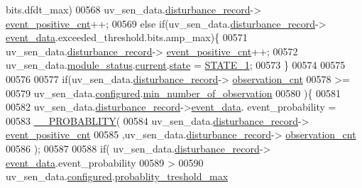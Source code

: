 \begin{DoxyCode}
      bits.dfdt\_max)
00568                uv\_sen\_data.\hyperlink{a00035_ac9b38e2c1d3f1013a88d33506c754152}{disturbance\_record}->
      \hyperlink{a00028_a7397b9d76d4b57500f27bb23d258a18a}{event\_positive\_cnt}++;
00569             \textcolor{keywordflow}{else}  \textcolor{keywordflow}{if}(uv\_sen\_data.\hyperlink{a00035_ac9b38e2c1d3f1013a88d33506c754152}{disturbance\_record}->
      \hyperlink{a00028_a8c0bda69e71ef674e60da47ad0be9ab0}{event\_data}.exceeded\_threshold.bits.amp\_max)\{
00571                uv\_sen\_data.\hyperlink{a00035_ac9b38e2c1d3f1013a88d33506c754152}{disturbance\_record}->
      \hyperlink{a00028_a7397b9d76d4b57500f27bb23d258a18a}{event\_positive\_cnt}++;
00572                uv\_sen\_data.\hyperlink{a00035_a5a53c391562b059eb744ac679f3765ca}{module\_status}.\hyperlink{a00017_ab8af48cdbba92b3ae39c4470e53af944}{current}.\hyperlink{a00017_a6b8d8e916bc56265a3fd279bd26b6d1b}{state} = 
      \hyperlink{a00021_a727351838367f27ac0adb9a13422c342}{STATE\_1};
00573             \}
00574 
00575 
00576 
00577                \textcolor{keywordflow}{if}(uv\_sen\_data.\hyperlink{a00035_ac9b38e2c1d3f1013a88d33506c754152}{disturbance\_record}->
      \hyperlink{a00028_ad5b0bac02ce266b91b2b52a1c3ea1d78}{observation\_cnt}
00578                 >=
00579                 uv\_sen\_data.\hyperlink{a00035_a94b2d1f6ea4ab334c74d24984dd27843}{configured}.\hyperlink{a00021_ae8665e8bf422c1482442d6949ba28408}{min\_number\_of\_observation}
00580                )\{
00581 
00582                     uv\_sen\_data.\hyperlink{a00035_ac9b38e2c1d3f1013a88d33506c754152}{disturbance\_record}->\hyperlink{a00028_a8c0bda69e71ef674e60da47ad0be9ab0}{event\_data}.
      event\_probability =
00583                            \hyperlink{a00021_ab2185512402ea26115af112ce48175b2}{\_\_PROBABLITY}(
00584                            uv\_sen\_data.\hyperlink{a00035_ac9b38e2c1d3f1013a88d33506c754152}{disturbance\_record}->
      \hyperlink{a00028_a7397b9d76d4b57500f27bb23d258a18a}{event\_positive\_cnt}
00585                           ,uv\_sen\_data.\hyperlink{a00035_ac9b38e2c1d3f1013a88d33506c754152}{disturbance\_record}->
      \hyperlink{a00028_ad5b0bac02ce266b91b2b52a1c3ea1d78}{observation\_cnt}
00586                            );
00587 
00588                    \textcolor{keywordflow}{if}( uv\_sen\_data.\hyperlink{a00035_ac9b38e2c1d3f1013a88d33506c754152}{disturbance\_record}->
      \hyperlink{a00028_a8c0bda69e71ef674e60da47ad0be9ab0}{event\_data}.event\_probability
00589                         >
00590                        uv\_sen\_data.\hyperlink{a00035_a94b2d1f6ea4ab334c74d24984dd27843}{configured}.\hyperlink{a00021_a7e2d217b9c9051d361319180a426851c}{probablity\_treshold\_max}

\end{DoxyCode}
